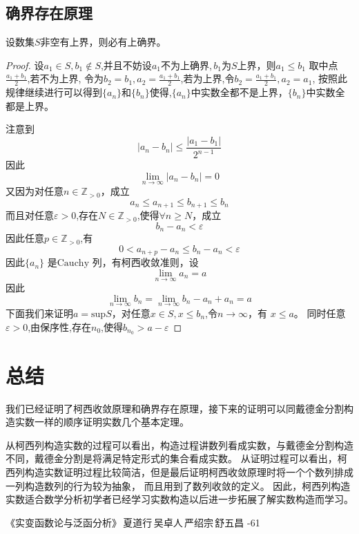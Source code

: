 \documentclass[12pt, a4paper, oneside]{ctexart}
\newcommand{\ep}{\varepsilon}
\newcommand{\cau}{\text{Cauchy}}
\newcommand{\an}{\{a_{n}\}}
\newcommand{\bn}{\{b_{n}\}}
\begin{document}
\subsection{确界存在原理}
设数集$S$非空有上界，则必有上确界。
\begin{proof}
    设$a_1\in S,b_{1}\notin S$,并且不妨设$a_{1}$不为上确界,\,$b_{1}$为$S$上界，则$a_{1}\le b_{1}$
    取中点$\frac{a_{1}+b_{1}}{2}$,若不为上界,
    令为$b_{2}=b_{1},a_{2}=\frac{a_{1}+b_{1}}{2}$,若为上界,令$b_{2}=\frac{a_{1}+b_{1}}{2},a_{2}=a_{1}$,
    按照此规律继续进行可以得到$\an$和$\bn$使得,$\an$中实数全都不是上界，$\bn$中实数全都是上界。

    注意到$$|a_{n}-b_{n}|\le \frac{|a_{1}-b_{1}|}{2^{n-1}}$$
    因此$$\lim_{n\to \infty}|a_{n}-b_{n}|=0$$
    又因为对任意$n\in \mathbb{Z}_{>0}$，成立$$a_{n}\le a_{n+1}\le b_{n+1}\le b_{n}$$
    而且对任意$\ep>0$,存在$N\in \mathbb{Z}_{>0}$,使得$\forall n\ge N$，成立
    $$ b_{n}-a_{n}<\ep$$
    因此任意$p\in \mathbb{Z}_{>0}$,有$$0<a_{n+p}-a_{n}\le b_{n}-a_{n}<\ep $$
    因此$\an$ 是$\cau$ 列，有柯西收敛准则，设$$\lim_{n\to \infty}a_{n}=a$$
    因此$$\lim_{n\to \infty}b_{n}=\lim_{n\to \infty}b_{n}-a_{n}+a_{n}=a$$
    下面我们来证明$a=\text{sup}S$，对任意$x\in S,x\le  b_{n}$,令$n\rightarrow \infty$，有 $x\le a$。
    同时任意$\ep>0$,由保序性,存在$n_{0}$,使得$b_{n_{0}}>a-\ep$
\end{proof}

\section{总结}
我们已经证明了柯西收敛原理和确界存在原理，接下来的证明可以同戴德金分割构造实数一样的顺序证明实数几个基本定理。

从柯西列构造实数的过程可以看出，构造过程讲数列看成实数，与戴德金分割构造不同，戴德金分割是将满足特定形式的集合看成实数。
从证明过程可以看出，柯西列构造实数证明过程比较简洁，但是最后证明柯西收敛原理时将一个个数列排成一列构造数列的行为较为抽象，
而且用到了数列收敛的定义。
因此，柯西列构造实数适合数学分析初学者已经学习实数构造以后进一步拓展了解实数构造而学习。



\begin{thebibliography}{99}
    《实变函数论与泛函分析》\,夏道行\,吴卓人\,严绍宗\,舒五昌 -61
\end{thebibliography}
\end{document}

